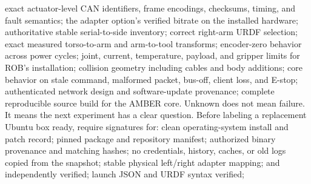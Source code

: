 \markdownRendererUlItem exact actuator-level CAN identifiers, frame encodings, checksums, timing, and fault semantics;\markdownRendererUlItemEnd 
\markdownRendererUlItem the adapter option's verified bitrate on the installed hardware;\markdownRendererUlItemEnd 
\markdownRendererUlItem authoritative stable serial-to-side inventory;\markdownRendererUlItemEnd 
\markdownRendererUlItem correct right-arm URDF selection;\markdownRendererUlItemEnd 
\markdownRendererUlItem exact measured torso-to-arm and arm-to-tool transforms;\markdownRendererUlItemEnd 
\markdownRendererUlItem encoder-zero behavior across power cycles;\markdownRendererUlItemEnd 
\markdownRendererUlItem joint, current, temperature, payload, and gripper limits for ROB's installation;\markdownRendererUlItemEnd 
\markdownRendererUlItem collision geometry including cables and body additions;\markdownRendererUlItemEnd 
\markdownRendererUlItem core behavior on stale command, malformed packet, bus-off, client loss, and E-stop;\markdownRendererUlItemEnd 
\markdownRendererUlItem authenticated network design and software-update provenance;\markdownRendererUlItemEnd 
\markdownRendererUlItem complete reproducible source build for the AMBER core.\markdownRendererUlItemEnd 
\markdownRendererUlEnd \markdownRendererInterblockSeparator
{}Unknown does not mean failure. It means the next experiment has a clear question.\markdownRendererInterblockSeparator
{}
\markdownRendererSectionEnd \markdownRendererSectionBegin
{}\markdownRendererInterblockSeparator
{}Before labeling a replacement Ubuntu box ready, require signatures for:\markdownRendererInterblockSeparator
{}\markdownRendererUlBegin
\markdownRendererUlItem \markdownRendererUntickedBox{} clean operating-system install and patch record;\markdownRendererUlItemEnd 
\markdownRendererUlItem \markdownRendererUntickedBox{} pinned package and repository manifest;\markdownRendererUlItemEnd 
\markdownRendererUlItem \markdownRendererUntickedBox{} authorized binary provenance and matching hashes;\markdownRendererUlItemEnd 
\markdownRendererUlItem \markdownRendererUntickedBox{} no credentials, history, caches, or old logs copied from the snapshot;\markdownRendererUlItemEnd 
\markdownRendererUlItem \markdownRendererUntickedBox{} stable physical left/right adapter mapping;\markdownRendererUlItemEnd 
\markdownRendererUlItem \markdownRendererUntickedBox{}  and  independently verified;\markdownRendererUlItemEnd 
\markdownRendererUlItem \markdownRendererUntickedBox{} launch JSON and URDF syntax verified;\markdownRendererUlItemEnd 
